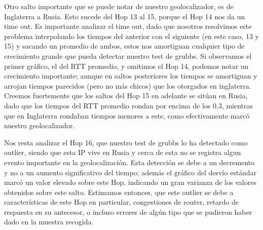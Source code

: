 Otro salto importante que se puede notar de nuestro geolocalizador, es de Inglaterra a Rusia. Esto sucede del Hop 13 al 15, porque el Hop 14 nos da un time out. Es importante analizar el time out, dado que nosotros resolvimos este problema interpolando los tiempos del anterior con el siguiente (en este caso, 13 y 15) y sacando un promedio de ambos, estos nos amortiguan cualquier tipo de crecimiento grande que pueda detectar nuestro test de grubbs. Si observamos el primer gráfico, el del RTT promedio, y omitimos el Hop 14, podemos notar un crecimiento importante; aunque en saltos posteriores los tiempos se amortiguan y arrojan tiempos parecidos (pero no más chicos) que los otorgados en inglaterra. Creemos fuertemente que los saltos del Hop 15 en adelante se sitúan en Rusia, dado que los tiempos del RTT promedio rondan por encima de los $0.3$, mientras que en Inglaterra rondaban tiempos menores a este, como efectivamente marcó nuestro geolocalizador.\newline

Nos resta analizar el Hop 16, que nuestro test de grubbs lo ha detectado como outlier, siendo que esta IP vive en Rusia y cerca de esta no se registra algun evento importante en la geolocalización. Esta detección se debe a un decremento y no a un aumento significativo del tiempo; además el gráfico del desvío estándar marcó un valor elevado sobre este Hop, indicando un gran varianza de los valores obtenidos sobre este salto. Estimamos entonces, que este outlier se debe a características de este Hop en particular, congestiones de router, retardo de respuesta en su antecesor, o incluso errores de algún tipo que se pudieron haber dado en la muestra recogida.




